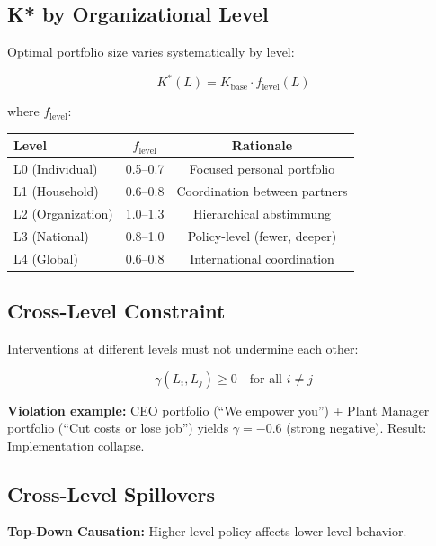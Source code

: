 \subsection{K* by Organizational Level}

Optimal portfolio size varies systematically by level:

\begin{equation}
\boxed{
K^*(L) = K_{\text{base}} \cdot f_{\text{level}}(L)
}
\end{equation}

where $f_{\text{level}}$:

\begin{center}
\begin{tabular}{@{}lcc@{}}
\toprule
\textbf{Level} & \textbf{$f_{\text{level}}$} & \textbf{Rationale} \\
\midrule
L0 (Individual) & 0.5--0.7 & Focused personal portfolio \\
L1 (Household) & 0.6--0.8 & Coordination between partners \\
L2 (Organization) & 1.0--1.3 & Hierarchical abstimmung \\
L3 (National) & 0.8--1.0 & Policy-level (fewer, deeper) \\
L4 (Global) & 0.6--0.8 & International coordination \\
\bottomrule
\end{tabular}
\end{center}

\subsection{Cross-Level Constraint}

Interventions at different levels must not undermine each other:

\begin{equation}
\boxed{
\gamma(L_i, L_j) \geq 0 \quad \text{for all } i \neq j
}
\end{equation}

\textbf{Violation example:} CEO portfolio (``We empower you'') + Plant Manager portfolio
(``Cut costs or lose job'') yields $\gamma = -0.6$ (strong negative). Result: Implementation collapse.

\subsection{Cross-Level Spillovers}

\textbf{Top-Down Causation:} Higher-level policy affects lower-level behavior.

